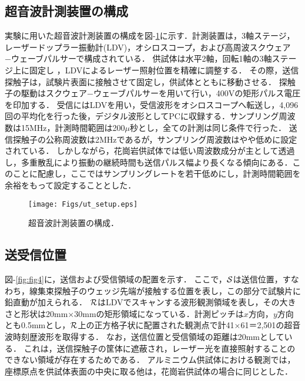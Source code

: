 \subsection{超音波計測装置の構成}
実験に用いた超音波計測装置の構成を図-\ref{fig:fig3}に示す．計測装置は，3軸ステージ，レーザードップラー振動計(LDV)，オシロスコープ，および高周波スクウェア−ウェーブパルサーで構成されている．
供試体は水平2軸，回転1軸の3軸ステージ上に固定し ，LDVによるレーザー照射位置を精確に調整する．
その際，送信探触子は，試験片表面に接触させて固定し，供試体とともに移動させる．
探触子の駆動はスクウェア−ウェーブパルサーを用いて行い，400Vの矩形パルス電圧を印加する．
受信にはLDVを用い，受信波形をオシロスコープへ転送し，4,096回の平均化を行った後，デジタル波形としてPCに収録する．サンプリング周波数は15MHz，計測時間範囲は200$\mu$秒とし，全ての計測は同じ条件で行った．
送信探触子の公称周波数は2MHzであるが，サンプリング周波数はやや低めに設定されている．
しかしながら，花崗岩供試体では低い周波数成分が主として透過し，多重散乱により振動の継続時間も送信パルス幅より長くなる傾向にある．このことに配慮し，ここではサンプリングレートを若干低めにし，計測時間範囲を余裕をもって設定することとした．
\begin{figure}[t]
\begin{center}
\texttt{[image: Figs/ut\_setup.eps]}
\caption{
	超音波計測装置の構成．
}
\label{fig:fig3}
\end{center}
\end{figure}
\subsection{送受信位置}
図-\ref{fig:fig4}に，送信および受信領域の配置を示す．
ここで，${\cal S}$は送信位置，すなわち，線集束探触子のウェッジ先端が接触する位置を表し，この部分で試験片に鉛直動が加えられる．
${\cal R}$はLDVでスキャンする波形観測領域を表し，その大きさと形状は20mm$\times$30mmの矩形領域になっている．計測ピッチは$x$方向，$y$方向とも0.5mmとし，$\cal R$上の正方格子状に配置された観測点で計41×61＝2,501の超音波時刻歴波形を取得する．
なお，送信位置と受信領域の距離は20mmとしている．
これは，送信探触子の筐体に遮蔽され，レーザー光を直接照射することのできない領域が存在するためである．
アルミニウム供試体における観測では，座標原点を供試体表面の中央に取る他は，花崗岩供試体の場合に同じとした．

